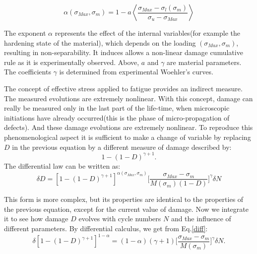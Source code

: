 \vspace{6pt}
$$\alpha(\sigma_{Max},\sigma_m)=1-a\left\langle\dfrac{\sigma_{Max}-\sigma_l(\sigma_m)}{\sigma_u-\sigma_{Max}}\right\rangle$$
\vspace{6pt}

The exponent $\alpha$ represents the effect of the internal variables(for example the hardening state of the material), which depends on the loading $(\sigma_{Max},\sigma_m)$, resulting in non-separability. It induces allows a non-linear damage cumulative rule as it is experimentally observed. Above, $a$ and $\gamma$ are material parameters. The coefficients $\gamma$ is determined from experimental Woehler's curves. 

The concept of effective stress applied to fatigue provides an indirect measure. The measured evolutions are extremely nonlinear. With this concept, damage can really be measured only in the last part of the life-time, when microscopic initiations have already occurred(this is the phase of micro-propagation of defects). And these damage evolutions are extremely nonlinear. To reproduce this phenomenological aspect it is sufficient to make a change of variable by replacing $D$ in the previous equation by a different measure of damage described by:
$$1-(1-D)^{\gamma+1}.$$
The differential law can be written as:
\begin{equation}\delta D=[1-(1-D)^{\gamma+1}]^{\alpha(\sigma_{Max},\sigma_m)}\big[\frac{\sigma_{Max}-\sigma_m}{M(\sigma_m)(1-D)}\big]^\gamma\delta N
\label{diff}
\end{equation}

This form is more complex, but its properties are identical to the properties of the previous equation, except for the current value of damage. Now we integrate it to see how damage $D$ evolves with cycle numbers $N$ and the influence of different parameters. By differential calculus, we get from Eq.\eqref{diff}:
\begin{equation}\delta [1-(1-D)^{\gamma+1}]^{1-\alpha}=(1-\alpha)(\gamma+1)\big[\frac{\sigma_{Max}-\sigma_m}{M(\sigma_m)}\big]^\gamma\delta N.
\label{easyintegration}
\end{equation}



